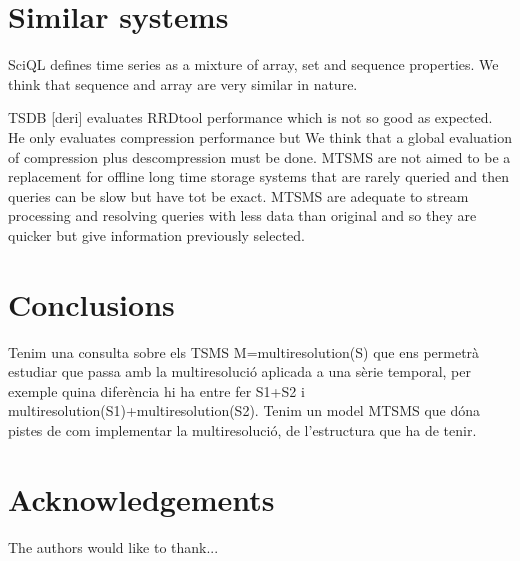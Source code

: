 

\section{Similar systems}




SciQL defines time series as a mixture of array, set and sequence properties. We think that sequence and array are very similar in nature. 



TSDB [deri] evaluates RRDtool performance which is not so good as expected. He only evaluates compression performance but We think that a global evaluation of compression plus descompression must be done. MTSMS are not aimed to be a replacement for offline long time storage systems that are rarely queried and then queries can be slow but have tot be exact. MTSMS are adequate to stream processing and resolving queries with less data than original and so they are quicker but give information previously selected.






\section{Conclusions}

Tenim una consulta sobre els TSMS M=multiresolution(S) que ens permetrà estudiar que passa amb la multiresolució aplicada a una sèrie temporal, per exemple quina diferència hi ha entre fer S1+S2 i multiresolution(S1)+multiresolution(S2).
Tenim un model MTSMS que dóna pistes de com implementar la multiresolució, de l'estructura que ha de tenir.



\section{Acknowledgements}


The authors would like to thank...









